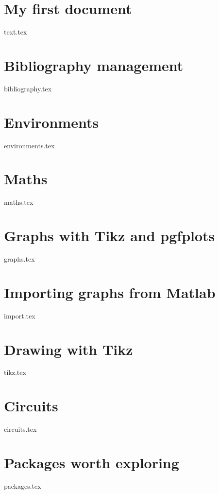\section{My first document}
    {text.tex}
\section{Bibliography management}
    {bibliography.tex}
\section{Environments}
    {environments.tex}
\section{Maths}
    {maths.tex}
\section{Graphs with Tikz and pgfplots}
    {graphs.tex}
\section{Importing graphs from Matlab}
    {import.tex}
\section{Drawing with Tikz}
    {tikz.tex}
\section{Circuits}
    {circuits.tex}
\section{Packages worth exploring}
    {packages.tex}